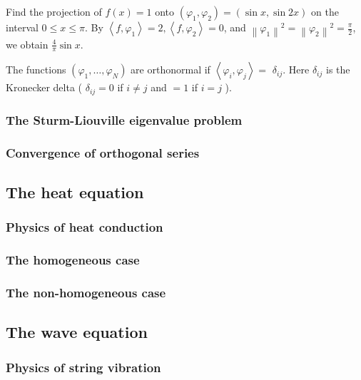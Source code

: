 \begin{example}[]
    Find the projection of $f(x)=1$ onto $\left(\varphi_1, \varphi_2\right)=(\sin x, \sin 2 x)$ on the interval $0 \leq x \leq \pi$. By $\left\langle f, \varphi_1\right\rangle=2,\left\langle f, \varphi_2\right\rangle=0$, and $\left\|\varphi_1\right\|^2=\left\|\varphi_2\right\|^2=\frac{\pi}{2}$, we obtain $\frac{4}{\pi} \sin x$.   
\end{example}

\begin{definition}[Orthonormal]
    The functions $\left(\varphi_1, \ldots, \varphi_N\right)$ are orthonormal if $\left\langle\varphi_i, \varphi_j\right\rangle=$ $\delta_{i j}$. Here $\delta_{i j}$ is the Kronecker delta ( $\delta_{i j}=0$ if $i \neq j$ and $=1$ if $i=j$ ).
\end{definition}

\subsubsection{The Sturm-Liouville eigenvalue problem}

\subsubsection{Convergence of orthogonal series}

\subsection{The heat equation}

\subsubsection{Physics of heat conduction}

\subsubsection{The homogeneous case}

\subsubsection{The non-homogeneous case}

\subsection{The wave equation}

\subsubsection{Physics of string vibration}

